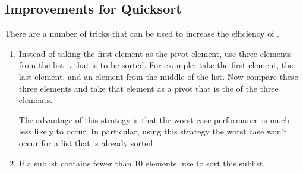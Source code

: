 \subsection{Improvements for Quicksort}
There are a number of tricks that can be used to increase the efficiency of .
\begin{enumerate}
\item Instead of taking the first element as the pivot element, use three elements from the list
      $\mathtt{L}$ that is to be sorted.  For example, take the first element, the last element, and an
      element from the middle of the list.  Now compare these three elements and take that element as
      a pivot that is the  of the three elements. 

      The advantage of this strategy is that the worst case performance is much less likely to occur.  In
      particular,  using this strategy the worst case won't occur for a list that is already
      sorted.
\item If a sublist contains fewer than 10 elements, use  to sort this sublist.


\end{enumerate}
